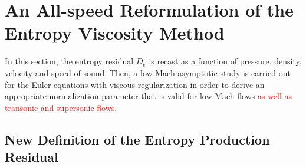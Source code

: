 \documentclass[preprint,10pt]{elsarticle}
\newcommand{\tcr}[1]{\textcolor{red}{#1}}
\begin{document}
\section{An All-speed Reformulation of the Entropy Viscosity Method} \label{sec:extension}

In this section, the entropy residual $D_e$ is recast as a function of pressure, density, velocity and speed of sound. Then, a low Mach asymptotic study is carried out for the Euler equations with viscous regularization in order to derive an appropriate  normalization parameter that is valid for low-Mach flows \tcr{as well as transonic and supersonic flows}. 

\subsection{New Definition of the Entropy Production Residual}\label{sec:new_ent_prod} 
\end{document}
